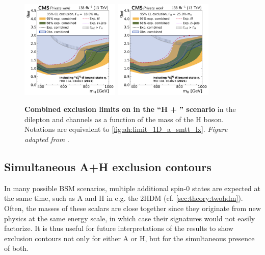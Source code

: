 \begin{figure}[!ph]
    \\
    \includegraphics[width=0.42\textwidth]{figures/ah/limits_combined/etat/H_limit_w18p0_g-scan.pdf}%
    \hspace*{0.05\textwidth}%
    \includegraphics[width=0.42\textwidth]{figures/ah/limits_combined/etat/H_limit_w25p0_g-scan.pdf}
    \caption{%
    \textbf{Combined exclusion limits on \gHtt in the ``H + \etat'' scenario} in the dilepton and \ljets channels as a function of the mass of the H boson. Notations are equivalent to \cref{fig:ah:limit_1D_a_smtt_lx}. \textit{Figure adapted from }.
    }
    \label{fig:ah:limit_1D_h_etat_lx}
\end{figure}

\subsection{Simultaneous A+H exclusion contours}

In many possible BSM scenarios, multiple additional spin-0 states are expected at the same time, such as A and H in e.g. the 2HDM (cf. \cref{sec:theory:twohdm}). Often, the masses of these scalars are close together since they originate from new physics at the same energy scale, in which case their signatures would not easily factorize. It is thus useful for future interpretations of the results to show exclusion contours not only for either A or H, but for the simultaneous presence of both.

